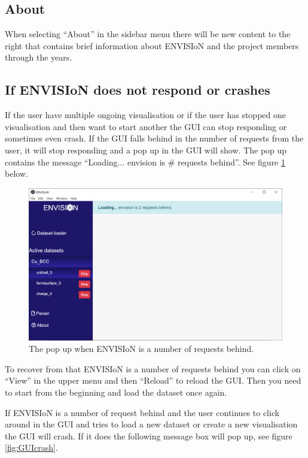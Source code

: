 \subsection{About}
When selecting ``About'' in the sidebar menu there will be new content to the right that contains brief information about ENVISIoN and the project members through the years.

\subsection{If ENVISIoN does not respond or crashes}
If the user have multiple ongoing visualisation or if the user has stopped one visualisation and then want to start another the GUI can stop responding or sometimes even crash. If the GUI falls behind in the number of requests from the user, it will stop responding and a pop up in the GUI will show. The pop up contains the message ``Loading... envision is # requests behind''. See figure \ref{fig:GUINotresponding} below. 

\begin{figure}[H]
    \centering
    \includegraphics[scale = 0.45]{Images/EnvisionRequestsbehind.png}
    \caption{The pop up when ENVISIoN is a number of requests behind.}
    \label{fig:GUINotresponding}
\end{figure}

To recover from that ENVISIoN is a number of requests behind you can click on ``View'' in the upper menu and then ``Reload'' to reload the GUI. Then you need to start from the beginning and load the dataset once again.

If ENVISIoN is a number of request behind and the user continues to click around in the GUI and tries to load a new dataset or create a new visualisation the GUI will crash. If it does the following message box will pop up, see figure \ref{fig:GUIcrash}.

